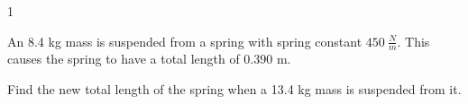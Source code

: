 
\AddToShipoutPicture*{\BackgroundPic}

\addtocounter {ProbNum} {1}

 
{\bf \Large{}} An 8.4 kg mass is suspended from a spring with spring constant ${450~\tfrac{N}{m}}$.  This causes the spring to have a total length of 0.390 m. 

\bigskip
Find the new total length of the spring when a 13.4 kg mass is suspended from it.



\vfill
\newpage